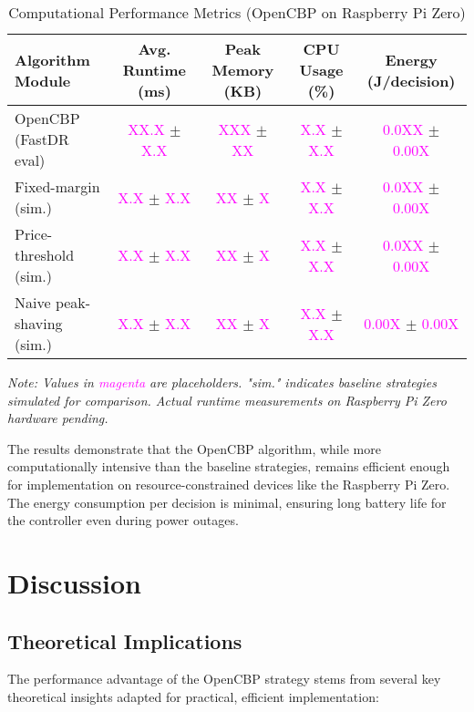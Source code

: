 \documentclass[11pt,a4paper]{article}
\begin{document}
\begin{table}[ht]
\centering
\caption{Computational Performance Metrics (OpenCBP on Raspberry Pi Zero)}
\label{tab:computational}
\begin{tabular}{lcccc}
\toprule
\textbf{Algorithm Module} & \textbf{Avg. Runtime (ms)} & \textbf{Peak Memory (KB)} & \textbf{CPU Usage (\%)} & \textbf{Energy (J/decision)} \\
\midrule
OpenCBP (FastDR eval) & \textcolor{magenta}{XX.X} $\pm$ \textcolor{magenta}{X.X} & \textcolor{magenta}{XXX} $\pm$ \textcolor{magenta}{XX} & \textcolor{magenta}{X.X} $\pm$ \textcolor{magenta}{X.X} & \textcolor{magenta}{0.0XX} $\pm$ \textcolor{magenta}{0.00X} \\
Fixed-margin (sim.) & \textcolor{magenta}{X.X} $\pm$ \textcolor{magenta}{X.X} & \textcolor{magenta}{XX} $\pm$ \textcolor{magenta}{X} & \textcolor{magenta}{X.X} $\pm$ \textcolor{magenta}{X.X} & \textcolor{magenta}{0.0XX} $\pm$ \textcolor{magenta}{0.00X} \\
Price-threshold (sim.) & \textcolor{magenta}{X.X} $\pm$ \textcolor{magenta}{X.X} & \textcolor{magenta}{XX} $\pm$ \textcolor{magenta}{X} & \textcolor{magenta}{X.X} $\pm$ \textcolor{magenta}{X.X} & \textcolor{magenta}{0.0XX} $\pm$ \textcolor{magenta}{0.00X} \\
Naive peak-shaving (sim.) & \textcolor{magenta}{X.X} $\pm$ \textcolor{magenta}{X.X} & \textcolor{magenta}{XX} $\pm$ \textcolor{magenta}{X} & \textcolor{magenta}{X.X} $\pm$ \textcolor{magenta}{X.X} & \textcolor{magenta}{0.00X} $\pm$ \textcolor{magenta}{0.00X} \\
\bottomrule
\end{tabular}
\end{table}
\footnotesize{\textit{Note: Values in \textcolor{magenta}{magenta} are placeholders. "sim." indicates baseline strategies simulated for comparison. Actual runtime measurements on Raspberry Pi Zero hardware pending.}}

The results demonstrate that the OpenCBP algorithm, while more computationally intensive than the baseline strategies, remains efficient enough for implementation on resource-constrained devices like the Raspberry Pi Zero. The energy consumption per decision is minimal, ensuring long battery life for the controller even during power outages.

\section{Discussion}
\subsection{Theoretical Implications}
The performance advantage of the OpenCBP strategy stems from several key theoretical insights adapted for practical, efficient implementation:
\end{document}
